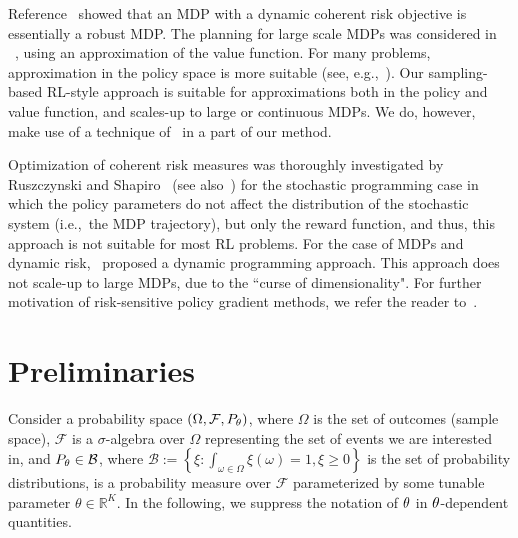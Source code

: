 \documentclass{article} %
\newcommand{\citet}{\cite}
\newcommand{\citealt}{\cite}
\begin{document}
Reference~\cite{osogami2012robustness} showed that an MDP with a dynamic coherent risk objective is essentially a robust MDP. The planning for large scale MDPs was considered in ~\citet{tamar2014robust}, using an approximation of the value function. For many problems, approximation in the policy space is more suitable (see, e.g.,~\citealt{MarTsi98}). Our sampling-based RL-style approach is suitable for approximations both in the policy and value function, and scales-up to large or continuous MDPs. We do, however, make use of a technique of~\citet{tamar2014robust} in a part of our method.

Optimization of coherent risk measures was thoroughly investigated by Ruszczynski and Shapiro~\cite{ruszczynski2006optimization} (see also~\citealt{Shapiro2009}) for the stochastic programming case in which the policy parameters do not affect the distribution of the stochastic system (i.e.,~the MDP trajectory), but only the reward function, and thus, this approach is not suitable for most RL problems. For the case of MDPs and dynamic risk,~\citet{ruszczynski2010risk} proposed a dynamic programming approach. This approach does not scale-up to large MDPs, due to the ``curse of dimensionality". For further motivation of risk-sensitive policy gradient methods, we refer the reader to~\citet{moody2001learning,tamar2012policy,prashanth2013actor,chow2014cvar,tamar2015optimizing}.



\section{Preliminaries}
\label{sec:background}

Consider a probability space $(\Omega, \mathcal F,P_{\theta})$, where $\Omega$ is the set of outcomes (sample space), $\mathcal F$ is a $\sigma$-algebra over $\Omega$ representing the set of events we are interested in, and $P_{\theta} \in \mathcal B$, where $\mathcal B:=\left\{ \xi: \int_{\omega\in\Omega} \xi(\omega)=1, \xi\geq 0 \right\}$ is the set of probability distributions, is a probability measure over $\mathcal F$ parameterized by some tunable parameter $\theta \in \mathbb R^{K}$. In the following, we suppress the notation of $\theta$ in $\theta$-dependent quantities.
\end{document}
